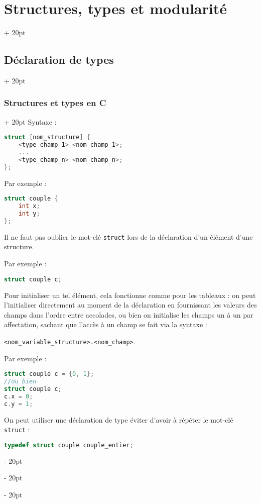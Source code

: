 \documentclass[a4paper, 12pt, twoside]{article}
\newcommand{\ind}[1][20pt]{\advance\leftskip + #1}
\newcommand{\deind}[1][20pt]{\advance\leftskip - #1}
\newenvironment{indt}[2][20pt]{#2 \par \ind[#1]}{\par \deind} %
\begin{document}
\begin{indt}{\section{Structures, types et modularité}}
\begin{indt}{\subsection{Déclaration de types}}
\begin{indt}{\subsubsection{Structures et types en C}}
                Syntaxe :
                \begin{lstlisting}[language=C, xleftmargin=80pt]
struct [nom_structure] {
    <type_champ_1> <nom_champ_1>;
    ...
    <type_champ_n> <nom_champ_n>;
};\end{lstlisting}
                
                Par exemple :
                \begin{lstlisting}[language=C, xleftmargin=80pt]
struct couple {
    int x;
    int y;
};\end{lstlisting}
                
                Il ne faut pas oublier le mot-clé \texttt{struct} lors de la déclaration d’un élément d’une structure.
                
                Par exemple :
                \begin{lstlisting}[language=C, xleftmargin=80pt]
struct couple c;\end{lstlisting}
                
                Pour initialiser un tel élément, cela fonctionne comme pour les tableaux : on peut l’initialiser directement au moment de la déclaration en fournissant les valeurs des champs dans l’ordre entre accolades, ou bien on initialise les champs un à un par affectation, sachant que l’accès à un champ se fait via la syntaxe :
                
                \texttt{<nom\_variable\_structure>.<nom\_champ>}.
                
                Par exemple :
                
                \begin{lstlisting}[language=C, xleftmargin=80pt]
struct couple c = {0, 1};
//ou bien
struct couple c;
c.x = 0;
c.y = 1;\end{lstlisting}
                
                \vspace{6pt}
                
                On peut utiliser une déclaration de type éviter d’avoir à répéter le mot-clé \texttt{struct} :
                
                \begin{lstlisting}[language=C, xleftmargin=80pt]
typedef struct couple couple_entier;\end{lstlisting}
                
                \vspace{6pt}
                

\end{indt}
\end{indt}
\end{indt}
\end{document}
